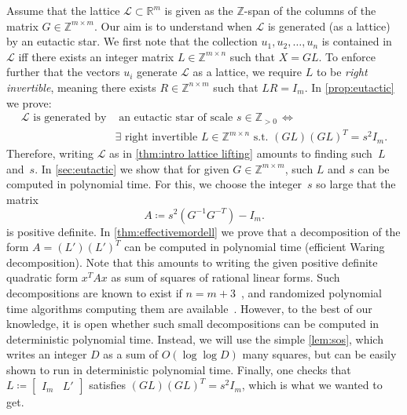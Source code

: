 \documentclass[10pt,a4paper]{article}
\theoremstyle{definition}
\newcommand{\ZZ}{\mathbb{Z}}
\newcommand{\RR}{\mathbb{R}}
\numberwithin{equation}{section}
\begin{document}
Assume that the lattice $\mathcal{L}\subset\RR^m$
is given as the $\ZZ$-span of the columns of the matrix $G\in\ZZ^{m\times m}$.
Our aim is to understand when $\mathcal{L}$ is generated (as a lattice) by an eutactic star.
We first note that the collection $u_1,u_2,\dots,u_n$ is contained in $\mathcal{L}$
iff there exists an integer matrix $L\in\ZZ^{m\times n}$ such that $X=GL$.
To enforce further that the vectors $u_i$ generate $\mathcal{L}$ as a lattice,
we require $L$ to be \textit{right invertible},
meaning there exists $R\in\ZZ^{n\times m}$ such that $LR=I_m$.
In \cref{prop:eutactic} we prove:
\begin{equation*}%
\begin{split}
 \mathcal{L}\text{ is generated by}&\text{ an eutactic star of scale } s\in \ZZ_{>0}\, \iff\, \\
 &\exists \text{ right invertible }L\in\ZZ^{m\times n} \text{ s.t. }
    (GL)(GL)^T = s^2 I_m.
\end{split}
\end{equation*}
Therefore, %
writing $\mathcal{L}$ as in \cref{thm:intro lattice lifting} amounts to finding such~$L$ and~$s$.
In \cref{sec:eutactic} we show that for given $G\in\ZZ^{m\times m}$,
such $L$ and $s$ can be computed in polynomial time.
For this, we choose the integer~$s$ so large that the matrix
\[
A\coloneqq s^2 (G^{-1}G^{-T})-I_m.
\]
is positive definite.
In \cref{thm:effectivemordell} we prove that a decomposition of the form $A=(L')(L')^T$
can be computed in polynomial time (efficient Waring decomposition).
Note that this amounts to writing the given positive definite quadratic form $x^T Ax$
as sum of squares of rational linear forms.
Such decompositions are known to exist if $n=m+3$~\cite{mordell},
and randomized polynomial time algorithms
computing them are available~\cite{rabin-shallit}.
However, to the best of our knowledge, it is open
whether such small decompositions can be computed in deterministic polynomial time.
Instead, we will use the simple \cref{lem:sos}, which writes an integer $D$ as a sum of $O(\log\log D)$ many squares,
but can be easily shown to run in deterministic polynomial time.
Finally, one checks that $L\coloneqq \begin{bmatrix} I_m & L'\end{bmatrix}$
satisfies $(GL)(GL)^T=s^2 I_m$, which is what we wanted to get.
\end{document}

